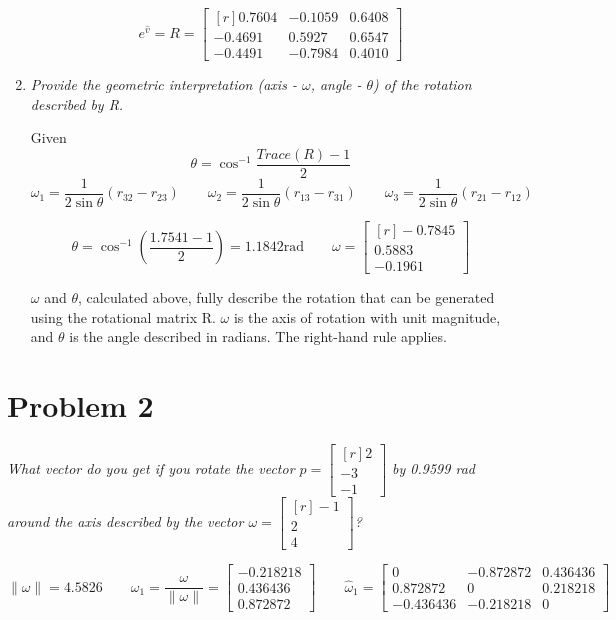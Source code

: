 \documentclass[10pt, oneside, letter]{article}
\begin{document}
\begin{enumerate}[label=(\alph*)]
			$$\boxed{e^{\hat{v}} = R = \begin{bmatrix*}[r]
			0.7604 & -0.1059 & 0.6408 \\ -0.4691 & 0.5927 & 0.6547 \\ -0.4491 & -0.7984 & 0.4010
			\end{bmatrix*}}$$
			
		\item \it Provide the geometric interpretation (axis - $\omega$, angle - $\theta$) of the rotation described by R. \rm
		
		Given $$\theta = \cos^{-1} \dfrac{Trace(R) - 1}{2}$$
		$$\omega_1 = \dfrac{1}{2 \sin \theta} (r_{32} - r_{23}) \qquad
		\omega_2 = \dfrac{1}{2 \sin \theta} (r_{13} - r_{31}) \qquad
		\omega_3 = \dfrac{1}{2 \sin \theta} (r_{21} - r_{12})
		$$
			
		$$\boxed{\theta = \cos^{-1} \left( \dfrac{1.7541 - 1}{2}\right) = 1.1842 \mathrm{rad} \qquad 
		\omega = \begin{bmatrix*}[r]
		-0.7845 \\ 0.5883 \\ -0.1961
		\end{bmatrix*}}$$
			
		$\omega$ and $\theta$, calculated above, fully describe the rotation that can be generated using the rotational matrix R. $\omega$ is the axis of rotation with unit magnitude, and $\theta$ is the angle described in radians. The right-hand rule applies.
	\end{enumerate}

\hrulefill

\section*{Problem 2}

	\it What vector do you get if you rotate the vector $p = \begin{bmatrix*}[r] 2 \\ -3 \\ -1
	\end{bmatrix*}$ 
	by 0.9599 rad around the axis described by the vector $\omega = \begin{bmatrix*}[r] -1 \\ 2 \\ 4
	\end{bmatrix*}$? \rm
	
		$${\| \omega \|} = 4.5826 \qquad
		\omega_1 = \dfrac{\omega}{\| \omega \|} = \left[ \begin{array}{r}
	 	 -0.218218 \\
		  0.436436 \\
	 	 0.872872
		\end{array} \right] \qquad
		\hat{\omega}_1 = 
		\left[ \begin{array}{ccc}
		  0 & -0.872872 & 0.436436 \\
		  0.872872 & 0 & 0.218218 \\
		  -0.436436 & -0.218218 & 0
		\end{array} \right]$$
		
\end{document}
